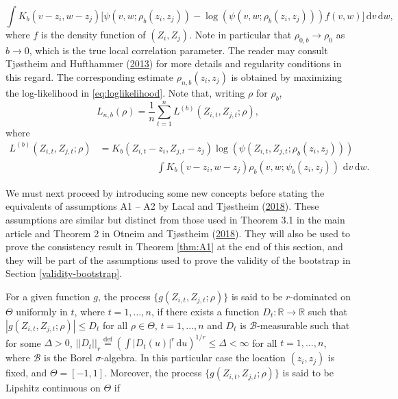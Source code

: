 \documentclass[
  12pt,
  letterpaper]{article}
\numberwithin{equation}{section}
\newcommand{\di}{\,\textrm{d}}
\begin{document}
\begin{equation}
\int K_b(v-z_i, w-z_j)\big[\psi(v,w; \rho_b(z_i, z_j)) - \log(\psi(v,w; \rho_b(z_i, z_j)))f(v,w)\big] \di v \di w,
\label{eq:penalty}
\end{equation}
where \(f\) is the density function of \((Z_i, Z_j)\). Note in particular that \(\rho_{0,b} \rightarrow \rho_0\) as \(b\rightarrow0\), which is the true local correlation parameter. The reader may consult Tjøstheim and Hufthammer (\protect\hyperlink{ref-tjostheim2013local}{2013}) for more details and regularity conditions in this regard. The corresponding estimate \(\rho_{n, b}(z_i,z_j)\) is obtained by maximizing the log-likelihood in \eqref{eq:loglikelihood}. Note that, writing \(\rho\) for \(\rho_b\),
\begin{equation}
L_{n,b}(\rho) = \frac{1}{n}\sum_{t=1}^n L^{(b)}(Z_{i,t}, Z_{j,t}; \rho),
\end{equation}
where
\begin{align}
L^{(b)}(Z_{i,t}, Z_{j,t}; \rho) &= K_b(Z_{i,t} - z_i, Z_{j,t} - z_j)\log\left(\psi(Z_{i,t}, Z_{j,t}; \rho_b(z_i, z_j))\right) \nonumber \\  
& \qquad\qquad\qquad \int K_b(v-z_i, w- z_j)\rho_b(v,w;\psi_b(z_i, z_j)) \, \di v \di w.
\label{eq:A16}
\end{align}

We must next proceed by introducing some new concepts before stating the equivalents of assumptions A1 -- A2 by Lacal and Tjøstheim (\protect\hyperlink{ref-lacal2018estimating}{2018}). These assumptions are similar but distinct from those used in Theorem 3.1 in the main article and Theorem 2 in Otneim and Tjøstheim (\protect\hyperlink{ref-otneim2017conditional}{2018}). They will also be used to prove the consistency result in Theorem \ref{thm:A1} at the end of this section, and they will be part of the assumptions used to prove the validity of the bootstrap in Section \ref{validity-bootstrap}.

For a given function \(g\), the process \(\{g(Z_{i,t}, Z_{j,t}; \rho)\}\) is said to be \(r\)-dominated on \(\Theta\) uniformly in \(t\), where \(t = 1,\ldots,n\), if there exists a function \(D_t: \mathbb{R} \rightarrow \mathbb{R}\) such that \(|g(Z_{i,t}, Z_{j,t}; \rho)| \leq D_t\) for all \(\rho \in \Theta\), \(t = 1,\ldots, n\) and \(D_t\) is \(\mathcal{B}\)-measurable such that for some \(\Delta > 0\), \(||D_t||_r \stackrel{\textrm{def}}{=} \left(\int |D_t(u)|^r\di u\right)^{1/r} \leq \Delta < \infty\) for all \(t = 1,\ldots,n\), where \(\mathcal{B}\) is the Borel \(\sigma\)-algebra. In this particular case the location \((z_i, z_j)\) is fixed, and \(\Theta = [-1,1]\). Moreover, the process \(\{g(Z_{i,t}, Z_{j,t}; \rho)\}\) is said to be Lipshitz continuous on \(\Theta\) if
\end{document}
